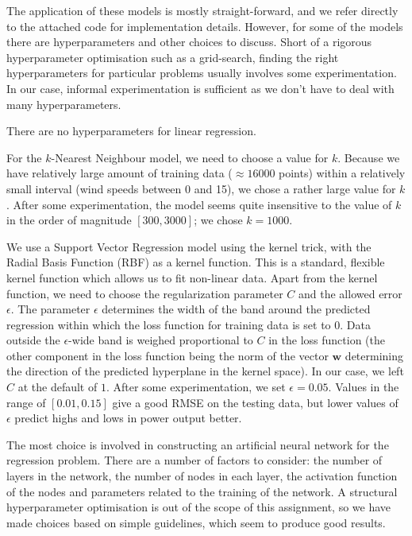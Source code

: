 \documentclass[11pt]{article}
\begin{document}
The application of these models is mostly straight-forward, and we refer directly to the attached code for implementation details.
However, for some of the models there are hyperparameters and other choices to discuss.
Short of a rigorous hyperparameter optimisation such as a grid-search, finding the right hyperparameters for particular problems usually involves some experimentation.
In our case, informal experimentation is sufficient as we don't have to deal with many hyperparameters.

There are no hyperparameters for linear regression.

For the $k$-Nearest Neighbour model, we need to choose a value for $k$.
Because we have relatively large amount of training data ($\approx 16000$ points) within a relatively small interval (wind speeds between 0 and 15), we chose a rather large value for $k$.
After some experimentation, the model seems quite insensitive to the value of $k$ in the order of magnitude $[300, 3000]$; we chose $k=1000$.

We use a Support Vector Regression model using the kernel trick, with the Radial Basis Function (RBF) as a kernel function.
This is a standard, flexible kernel function which allows us to fit non-linear data.
Apart from the kernel function, we need to choose the regularization parameter $C$ and the allowed error $\epsilon$.
The parameter $\epsilon$ determines the width of the band around the predicted regression within which the loss function for training data is set to $0$.
Data outside the $\epsilon$-wide band is weighed proportional to $C$ in the loss function (the other component in the loss function being the norm of the vector $\mathbf{w}$ determining the direction of the predicted hyperplane in the kernel space).
In our case, we left $C$ at the default of $1$.
After some experimentation, we set $\epsilon = 0.05$. Values in the range of $[0.01, 0.15]$ give a good RMSE on the testing data, but lower values of $\epsilon$ predict highs and lows in power output better.

The most choice is involved in constructing an artificial neural network for the regression problem.
There are a number of factors to consider: the number of layers in the network, the number of nodes in each layer, the activation function of the nodes and parameters related to the training of the network.
A structural hyperparameter optimisation is out of the scope of this assignment, so we have made choices based on simple guidelines, which seem to produce good results.
\end{document}
